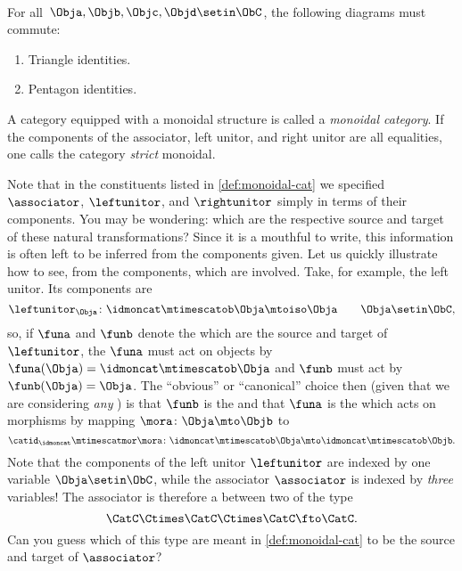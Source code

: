 \begin{ctdefinition}
    \condit\\
    For all~$\Obja,\Objb,\Objc,\Objd\setin \ObC$, the following diagrams must commute:
    \begin{enumerate}
        \item Triangle identities.
        \item Pentagon identities.
    \end{enumerate}
    A category equipped with a monoidal structure is called a \emph{monoidal category}.
    If the components of the associator, left unitor, and right unitor are all equalities, one calls the category \emph{strict} monoidal.
\end{ctdefinition}

\begin{remark}
    Note that in the constituents listed in \cref{def:monoidal-cat} we specified  $\associator$, $\leftunitor$, and $\rightunitor$ simply in terms of their components.
    You may be wondering: which  are the respective source and target of these natural transformations?
    Since it is a mouthful to write, this information is often left to be inferred from the components given.
    Let us quickly illustrate how to see, from the components, which  are involved.
    Take, for example, the left unitor.
    Its components are
    \begin{equation}
        \leftunitor_\Obja \colon \idmoncat\mtimescatob \Obja \mtoiso \Obja \quad \quad \Obja\setin \ObC,
    \end{equation}
    so, if $\funa$ and $\funb$ denote the  which are the source and target of $\leftunitor$, the  $\funa$ must act on objects by $\funa(\Obja) = \idmoncat \mtimescatob \Obja$ and $\funb$ must act by $\funb(\Obja) = \Obja$.
    The ``obvious'' or ``canonical'' choice then (given that we are considering \emph{any} ) is that $\funb$ is the  and that $\funa$ is the  which acts on morphisms by mapping $\mora \colon \Obja \mto \Objb$ to
    \begin{equation}
        \catid_\idmoncat \mtimescatmor \mora \colon \idmoncat\mtimescatob \Obja \mto \idmoncat\mtimescatob \Objb.
    \end{equation}
    Note that the components of the left unitor $\leftunitor$ are indexed by one variable $\Obja \setin \ObC$, while the associator $\associator$ is indexed by \emph{three} variables!
    The associator is therefore a  between two  of the type
    \begin{equation}
        \CatC \Ctimes \CatC \Ctimes \CatC \fto \CatC.
    \end{equation}
    Can you guess which  of this type are meant in \cref{def:monoidal-cat} to be the source and target of $\associator$?
\end{remark}

